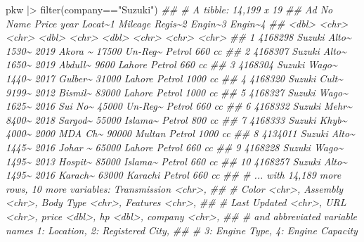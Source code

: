 \documentclass[
  letterpaper,
  DIV=11,
  numbers=noendperiod]{scrartcl}
\newenvironment{Shaded}{\begin{snugshade}}{\end{snugshade}}
\newcommand{\DocumentationTok}[1]{\textcolor[rgb]{0.37,0.37,0.37}{\textit{#1}}}
\newcommand{\FunctionTok}[1]{\textcolor[rgb]{0.28,0.35,0.67}{#1}}
\newcommand{\NormalTok}[1]{\textcolor[rgb]{0.00,0.23,0.31}{#1}}
\newcommand{\SpecialCharTok}[1]{\textcolor[rgb]{0.37,0.37,0.37}{#1}}
\newcommand{\StringTok}[1]{\textcolor[rgb]{0.13,0.47,0.30}{#1}}
\begin{document}
\begin{Shaded}
\begin{Highlighting}[]
\NormalTok{pkw }\SpecialCharTok{|\textgreater{}} \FunctionTok{filter}\NormalTok{(company}\SpecialCharTok{==}\StringTok{"Suzuki"}\NormalTok{)}
\DocumentationTok{\#\# \# A tibble: 14,199 x 19}
\DocumentationTok{\#\#    \textasciigrave{}Ad No\textasciigrave{} Name         Price  year Locat\textasciitilde{}1 Mileage Regis\textasciitilde{}2 Engin\textasciitilde{}3 Engin\textasciitilde{}4}
\DocumentationTok{\#\#      \textless{}dbl\textgreater{} \textless{}chr\textgreater{}        \textless{}chr\textgreater{} \textless{}dbl\textgreater{} \textless{}chr\textgreater{}     \textless{}dbl\textgreater{} \textless{}chr\textgreater{}   \textless{}chr\textgreater{}   \textless{}chr\textgreater{}  }
\DocumentationTok{\#\#  1 4168298 Suzuki Alto\textasciitilde{} 1530\textasciitilde{}  2019 Akora \textasciitilde{}   17500 Un{-}Reg\textasciitilde{} Petrol  660 cc }
\DocumentationTok{\#\#  2 4168307 Suzuki Alto\textasciitilde{} 1650\textasciitilde{}  2019 Abdull\textasciitilde{}    9600 Lahore  Petrol  660 cc }
\DocumentationTok{\#\#  3 4168304 Suzuki Wago\textasciitilde{} 1440\textasciitilde{}  2017 Gulber\textasciitilde{}   31000 Lahore  Petrol  1000 cc}
\DocumentationTok{\#\#  4 4168320 Suzuki Cult\textasciitilde{} 9199\textasciitilde{}  2012 Bismil\textasciitilde{}   83000 Lahore  Petrol  1000 cc}
\DocumentationTok{\#\#  5 4168327 Suzuki Wago\textasciitilde{} 1625\textasciitilde{}  2016 Sui No\textasciitilde{}   45000 Un{-}Reg\textasciitilde{} Petrol  660 cc }
\DocumentationTok{\#\#  6 4168332 Suzuki Mehr\textasciitilde{} 8400\textasciitilde{}  2018 Sargod\textasciitilde{}   55000 Islama\textasciitilde{} Petrol  800 cc }
\DocumentationTok{\#\#  7 4168333 Suzuki Khyb\textasciitilde{} 4000\textasciitilde{}  2000 MDA Ch\textasciitilde{}   90000 Multan  Petrol  1000 cc}
\DocumentationTok{\#\#  8 4134011 Suzuki Alto\textasciitilde{} 1445\textasciitilde{}  2016 Johar \textasciitilde{}   65000 Lahore  Petrol  660 cc }
\DocumentationTok{\#\#  9 4168228 Suzuki Wago\textasciitilde{} 1495\textasciitilde{}  2013 Hospit\textasciitilde{}   85000 Islama\textasciitilde{} Petrol  660 cc }
\DocumentationTok{\#\# 10 4168257 Suzuki Alto\textasciitilde{} 1495\textasciitilde{}  2016 Karach\textasciitilde{}   63000 Karachi Petrol  660 cc }
\DocumentationTok{\#\# \# ... with 14,189 more rows, 10 more variables: Transmission \textless{}chr\textgreater{},}
\DocumentationTok{\#\# \#   Color \textless{}chr\textgreater{}, Assembly \textless{}chr\textgreater{}, \textasciigrave{}Body Type\textasciigrave{} \textless{}chr\textgreater{}, Features \textless{}chr\textgreater{},}
\DocumentationTok{\#\# \#   \textasciigrave{}Last Updated\textasciigrave{} \textless{}chr\textgreater{}, URL \textless{}chr\textgreater{}, price \textless{}dbl\textgreater{}, hp \textless{}dbl\textgreater{}, company \textless{}chr\textgreater{},}
\DocumentationTok{\#\# \#   and abbreviated variable names 1: Location, 2: \textasciigrave{}Registered City\textasciigrave{},}
\DocumentationTok{\#\# \#   3: \textasciigrave{}Engine Type\textasciigrave{}, 4: \textasciigrave{}Engine Capacity\textasciigrave{}}
\end{Highlighting}
\end{Shaded}
\end{document}
